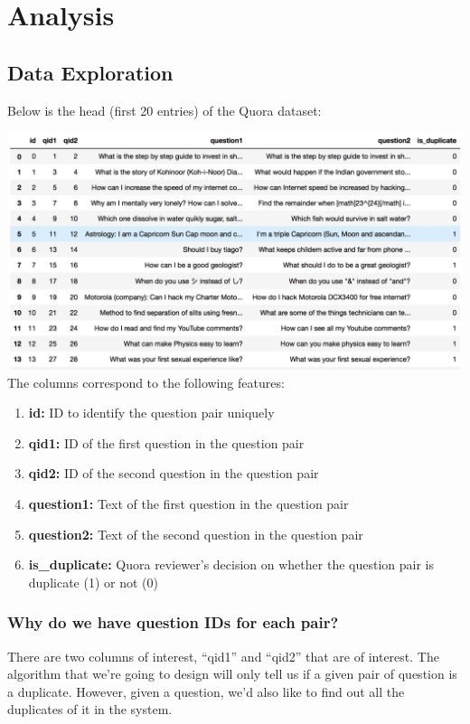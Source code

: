 \documentclass{article}
\begin{document}
\newpage
\section{Analysis}

\subsection{Data Exploration}

Below is the head (first 20 entries) of the Quora dataset:

\noindent\includegraphics[width=\textwidth]{data_head}
The columns correspond to the following features:

\begin{enumerate}
\item{\textbf{id:} ID to identify the question pair uniquely}
\item{\textbf{qid1:} ID of the first question in the question pair}
\item{\textbf{qid2:} ID of the second question in the question pair}
\item{\textbf{question1:} Text of the first question in the question pair}
\item{\textbf{question2:} Text of the second question in the question pair}
\item{\textbf{is\_duplicate:} Quora reviewer's decision on whether the question pair is duplicate (1) or not (0)}
\end{enumerate}

\subsubsection{Why do we have question IDs for each pair?}
There are two columns of interest, ``qid1'' and ``qid2'' that are of interest. The algorithm that we're going to design will only tell us if a given pair of question is a duplicate. However, given a question, we'd also like to find out all the duplicates of it in the system.
\end{document}
